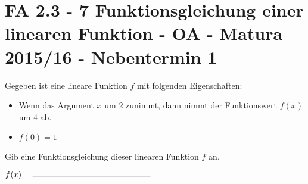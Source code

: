 \section{FA 2.3 - 7 Funktionsgleichung einer linearen Funktion - OA - Matura 2015/16 - Nebentermin 1}

\begin{beispiel}[FA 2.3]{1} %
Gegeben ist eine lineare Funktion $f$ mit folgenden Eigenschaften:

\begin{itemize}
	\item Wenn das Argument $x$ um 2 zunimmt, dann nimmt der Funktionswert $f(x)$ um 4 ab.
	\item $f(0)=1$
\end{itemize} 


Gib eine Funktionsgleichung dieser linearen Funktion $f$ an. \leer

$f(x)=\rule{5cm}{0.3pt}$

\end{beispiel}